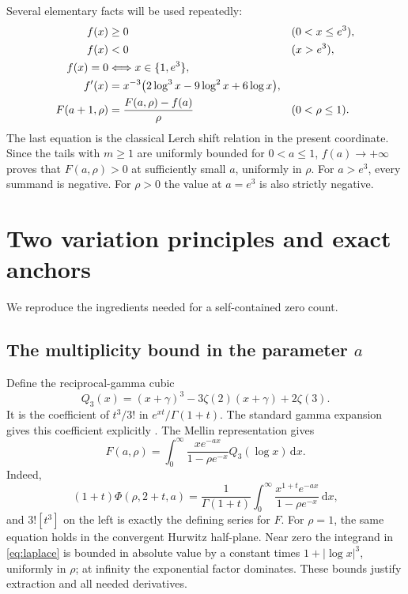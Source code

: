 \documentclass[11pt]{article}
\numberwithin{equation}{section}
\theoremstyle{definition}
\newcommand{\dd}{\,\mathrm d}
\begin{document}
Several elementary facts will be used repeatedly:
\begin{align}
 f(x)&\geq0 &&(0<x\leq e^3),\label{eq:signf}\\
 f(x)&<0 &&(x>e^3),\notag\\
 f(x)=0&\Longleftrightarrow x\in\{1,e^3\},\notag\\
 f'(x)&=x^{-3}\bigl(2\log^3x-9\log^2x+6\log x\bigr),\label{eq:df}\\
 F(a+1,\rho)&=\frac{F(a,\rho)-f(a)}{\rho}
 &&(0<\rho\leq1).\label{eq:shift}
\end{align}
The last equation is the classical Lerch shift relation in the present
coordinate. Since the tails with $m\geq1$ are uniformly bounded for $0<a\leq1$,
$f(a)\to+\infty$ proves that $F(a,\rho)>0$ at sufficiently small $a$, uniformly
in $\rho$. For $a>e^3$, every summand is negative. For $\rho>0$ the value at
$a=e^3$ is also strictly negative.

\section{Two variation principles and exact anchors}
\label{sec:variation}
We reproduce the ingredients needed for a self-contained zero count.

\subsection{The multiplicity bound in the parameter \texorpdfstring{$a$}{a}}
Define the reciprocal-gamma cubic
\begin{equation}\label{eq:Q3}
 Q_3(x)=(x+\gamma)^3-3\zeta(2)(x+\gamma)+2\zeta(3).
\end{equation}
It is the coefficient of $t^3/3!$ in $e^{xt}/\Gamma(1+t)$.
The standard gamma expansion gives this coefficient explicitly
\cite{dlmf-gamma}. The Mellin representation gives
\begin{equation}\label{eq:laplace}
 F(a,\rho)=\int_0^\infty
 \frac{x e^{-ax}}{1-\rho e^{-x}}Q_3(\log x)\dd x.
\end{equation}
Indeed,
\[
 (1+t)\Phi(\rho,2+t,a)
 =\frac1{\Gamma(1+t)}\int_0^\infty
       \frac{x^{1+t}e^{-ax}}{1-\rho e^{-x}}\dd x,
\]
and $3![t^3]$ on the left is exactly the defining series for $F$.
For $\rho=1$, the same equation holds in the convergent Hurwitz half-plane.
Near zero the integrand in \eqref{eq:laplace} is bounded in absolute value by a
constant times $1+|\log x|^3$, uniformly in $\rho$; at infinity the exponential
factor dominates. These bounds justify extraction and all needed derivatives.
\end{document}
